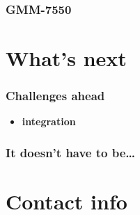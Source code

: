 \begin{frame}
\frametitle{GMM-7550}
\end{frame}

\section{What's next}

\begin{frame}
\frametitle{Challenges ahead}
\begin{itemize}
  \item \textbf{integration}
\end{itemize}
\end{frame}

\begin{frame}
\frametitle{It doesn't have to be\dots}
\end{frame}

\section{Contact info}



